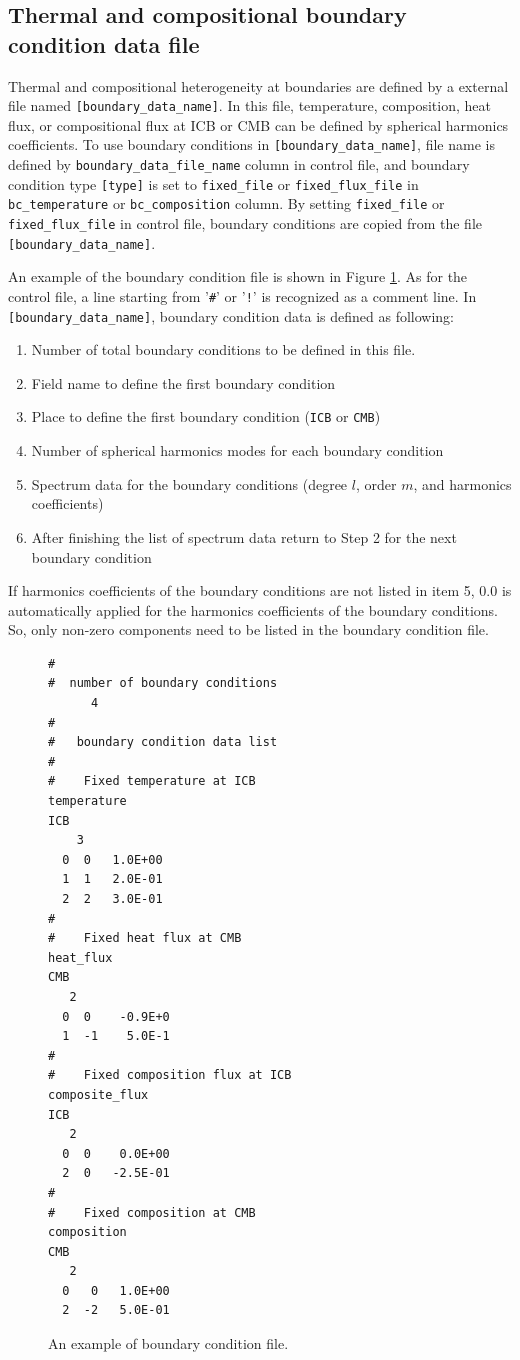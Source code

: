 \subsection{Thermal and compositional boundary condition data file}\label{sec:boundary_file}
Thermal and compositional heterogeneity at boundaries are defined by a external file named  \verb|[boundary_data_name]|. In this file, temperature, composition, heat flux, or compositional flux at ICB or CMB can be defined by spherical harmonics coefficients. To use boundary conditions in \verb|[boundary_data_name]|, file name is defined by \verb|boundary_data_file_name| column in control file, and boundary condition type \verb|[type]| is set to \verb|fixed_file| or \verb|fixed_flux_file| in \verb|bc_temperature| or \verb|bc_composition| column. By setting \verb|fixed_file| or \verb|fixed_flux_file| in control file, boundary conditions are copied from the file \verb|[boundary_data_name]|.

An example of the boundary condition file is shown in Figure \ref{fig:boundary_file}. As for the control file, a line starting from '\verb|#|' or '\verb|!|' is recognized as a comment line. In \verb|[boundary_data_name]|, boundary condition data is defined as following:
%
\begin{enumerate}
\item  Number of total boundary conditions to be defined in this file.
\item  Field name to define the first boundary condition
\item  Place to define the first boundary condition (\verb|ICB| or \verb|CMB|)
\item  Number of spherical harmonics modes for each boundary condition
\item  Spectrum data for the boundary conditions (degree $l$, order $m$, and harmonics coefficients)
\item  After finishing the list of spectrum data return to Step 2 for the next boundary condition
\end{enumerate}
%
If harmonics coefficients of the boundary conditions are not listed in item 5, 0.0 is automatically applied for the harmonics coefficients of the boundary conditions. So, only non-zero components need to be listed in the boundary condition file.

%
\begin{figure}[htbp]
\begin{center}
\begin{verbatim}
#
#  number of boundary conditions
      4
#
#   boundary condition data list
#
#    Fixed temperature at ICB
temperature
ICB
    3
  0  0   1.0E+00
  1  1   2.0E-01
  2  2   3.0E-01
#
#    Fixed heat flux at CMB
heat_flux
CMB
   2
  0  0    -0.9E+0
  1  -1    5.0E-1
#
#    Fixed composition flux at ICB
composite_flux
ICB
   2
  0  0    0.0E+00
  2  0   -2.5E-01
#
#    Fixed composition at CMB
composition
CMB
   2
  0   0   1.0E+00
  2  -2   5.0E-01
\end{verbatim}
\end{center}
\caption{An example of boundary condition file.}
\label{fig:boundary_file}
\end{figure}
%

